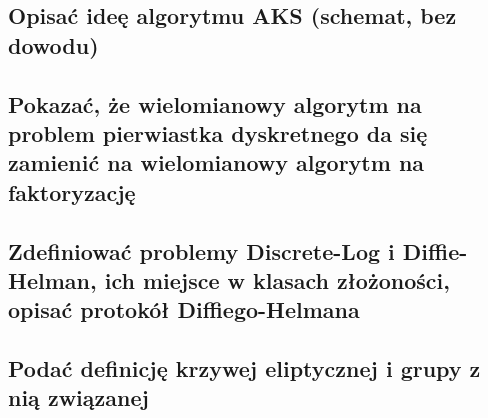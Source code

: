 \subsection{Opisać ideę algorytmu AKS (schemat, bez dowodu)}


\subsection{Pokazać, że wielomianowy algorytm na problem pierwiastka dyskretnego da się zamienić na wielomianowy algorytm na faktoryzację}



\subsection{Zdefiniować problemy Discrete-Log i Diffie-Helman, ich miejsce w klasach złożoności, opisać protokół Diffiego-Helmana}


\subsection{Podać definicję krzywej eliptycznej i grupy z nią związanej}

